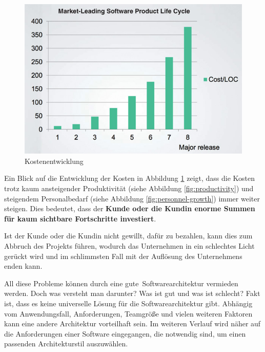 \begin{figure}[H]
    \centering
    \includegraphics[width=0.7\linewidth]{images/EA/diagram_costs.jpg}
    \caption{Kostenentwicklung \\ \cite[S. 7]{EA:Book01}}
    \label{fig:cost-development}
\end{figure}

Ein Blick auf die Entwicklung der Kosten in Abbildung \ref{fig:cost-development} zeigt, dass die Kosten trotz kaum ansteigender Produktivität (siehe Abbildung \ref{fig:productivity}) und steigendem Personalbedarf (siehe Abbildung \ref{fig:personnel-growth}) immer weiter steigen. Dies bedeutet, dass der \textbf{Kunde oder die Kundin enorme Summen für kaum sichtbare Fortschritte investiert}. 

Ist der Kunde oder die Kundin nicht gewillt, dafür zu bezahlen, kann dies zum Abbruch des Projekts führen, wodurch das Unternehmen in ein schlechtes Licht gerückt wird und im schlimmsten Fall mit der Auflösung des Unternehmens enden kann. \\
\cite[S. 5-10]{EA:Book01} 


All diese Probleme können durch eine \glqq gute\grqq\ Softwarearchitektur vermieden werden. Doch was versteht man darunter? Was ist gut und was ist schlecht? Fakt ist, dass es keine universelle Lösung für die Softwarearchitektur gibt. Abhängig vom Anwendungsfall, Anforderungen, Teamgröße und vielen weiteren Faktoren kann eine andere Architektur vorteilhaft sein.
Im weiteren Verlauf wird näher auf die Anforderungen einer Software eingegangen, die notwendig sind, um einen passenden Architekturstil auszuwählen.
